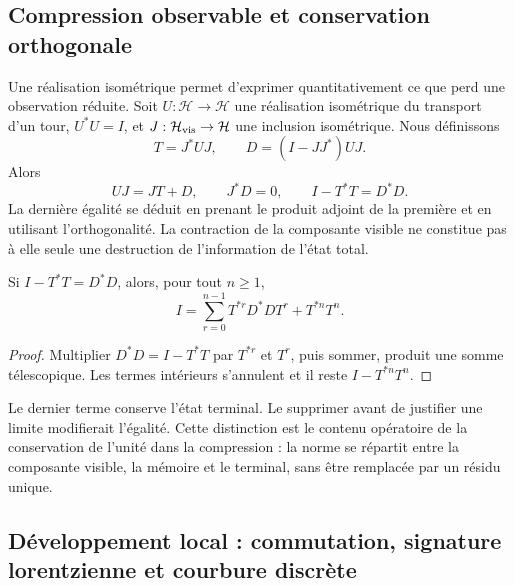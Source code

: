 \subsection{Compression observable et conservation orthogonale}

Une réalisation isométrique permet d’exprimer quantitativement ce que perd une observation réduite. Soit \(U:\mathcal H\to\mathcal H\) une réalisation isométrique du transport d’un tour, \(U^*U=I\), et \(J:\mathcal H_{\rm vis}\to\mathcal H\) une inclusion isométrique. Nous définissons
\[
 T=J^*UJ,\qquad D=(I-JJ^*)UJ.
\]
Alors
\begin{equation}
 UJ=JT+D,\qquad J^*D=0,\qquad I-T^*T=D^*D.
 \label{eq:conservacion-ortogonal}
\end{equation}
La dernière égalité se déduit en prenant le produit adjoint de la première et en utilisant l’orthogonalité. La contraction de la composante visible ne constitue pas à elle seule une destruction de l’information de l’état total.

\begin{proposition}
Si \(I-T^*T=D^*D\), alors, pour tout \(n\ge1\),
\begin{equation}
 I=\sum_{r=0}^{n-1}T^{*r}D^*DT^r+T^{*n}T^n.
 \label{eq:telescopia}
\end{equation}
\end{proposition}
\begin{proof}
Multiplier \(D^*D=I-T^*T\) par \(T^{*r}\) et \(T^r\), puis sommer, produit une somme télescopique. Les termes intérieurs s’annulent et il reste \(I-T^{*n}T^n\).
\end{proof}

Le dernier terme conserve l’état terminal. Le supprimer avant de justifier une limite modifierait l’égalité. Cette distinction est le contenu opératoire de la conservation de l’unité dans la compression : la norme se répartit entre la composante visible, la mémoire et le terminal, sans être remplacée par un résidu unique.

\subsection{Développement local : commutation, signature lorentzienne et courbure discrète}

